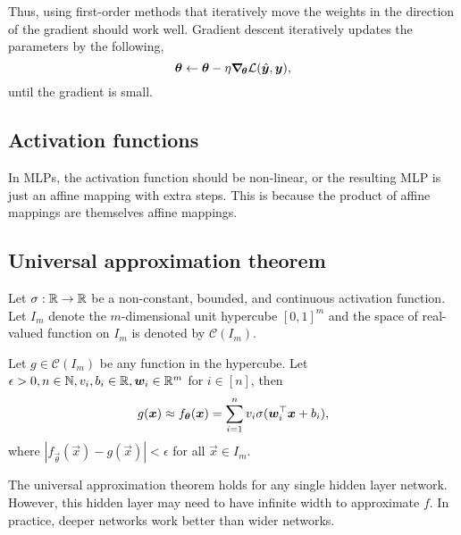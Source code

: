 Thus, using first-order methods that iteratively move the weights in the direction of the gradient
should work well. Gradient descent iteratively updates the parameters by the following, \[
    \bm{\theta} \gets \bm{\theta} - \eta \bm{\nabla}_{\! \bm{\theta}} \mathcal{L}(\hat{\bm{y}},\bm{y}),
\]
until the gradient is small.

\subsection{Activation functions}

In MLPs, the activation function should be non-linear, or the resulting MLP is just an affine
mapping with extra steps. This is because the product of affine mappings are themselves affine
mappings.

\subsection{Universal approximation theorem}

\begin{theorem}
    Let $\sigma: \mathbb{R}\to \mathbb{R}$ be a non-constant, bounded, and continuous activation function.
    Let $I_m$ denote the $m$-dimensional unit hypercube $[0,1]^m$ and the space of real-valued
    function on $I_m$ is denoted by $\mathcal{C}(I_m)$.

    Let $g \in \mathcal{C}(I_m)$ be any function in the hypercube. Let $\epsilon > 0, n\in \mathbb{N},
        v_i,b_i \in \mathbb{R}, \bm{w}_i \in \mathbb{R}^m$ for $i \in [n]$, then \[
        g(\bm{x}) \approx f_{\bm{\theta}}(\bm{x}) = \sum_{i=1}^{n} v_i \sigma(\bm{w}_i^\top \bm{x} + b_i),
    \]
    where $|f_{\vec{\theta}}(\vec{x}) - g(\vec{x})| < \epsilon$ for all $\vec{x}\in I_m$.
\end{theorem}

The universal approximation theorem holds for any single hidden layer network. However, this hidden
layer may need to have infinite width to approximate $f$. In practice, deeper networks work better
than wider networks.
